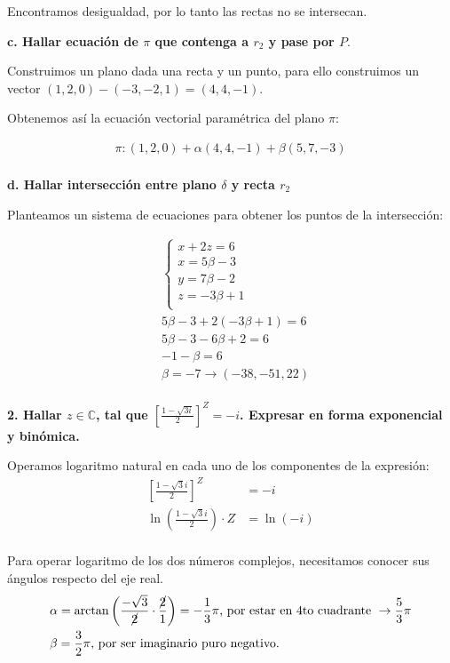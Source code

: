 \documentclass[12pt]{article}
\begin{document}
Encontramos desigualdad,
por lo tanto las rectas no se intersecan.

\textbf{c. Hallar ecuación de \(\pi\) que contenga a \(r_{2}\) y pase por \(P\)}.

Construimos un plano dada una recta y un punto, para ello construimos
un vector \((1,2,0) - (-3,-2,1) = (4,4,-1)\).

Obtenemos así la ecuación vectorial paramétrica del plano \(\pi\):

\begin{align*}
  \pi: (1,2,0) + \alpha(4,4,-1) + \beta(5,7,-3) \\
\end{align*}

\textbf{d. Hallar intersección entre plano \(\delta\) y recta \(r_{2}\)}

Planteamos un sistema de ecuaciones para obtener los puntos de la intersección:

\begin{align*}
   & \begin{cases}
       x + 2z = 6      \\
       x = 5\beta - 3  \\
       y = 7\beta - 2  \\
       z = -3\beta + 1 \\
     \end{cases}                                     \\
   & 5\beta - 3 + 2(-3\beta + 1) = 6                     \\
   & 5\beta - 3 -6\beta + 2 = 6                          \\
   & - 1 -\beta = 6                                      \\
   & \boxed{\beta = -7} \rightarrow \boxed{(-38,-51,22)} \\
\end{align*}

\textbf{2. Hallar
  \(z \in \mathbb{C}\), tal que \(\left[\frac{1-\sqrt{3i}}{2}\right]^{Z}=-i\).
  Expresar en forma exponencial y binómica.}

Operamos logaritmo natural en cada uno de los componentes de la expresión:
\begin{align*}
  \left[\frac{1-\sqrt{3}i}{2}\right]^{Z}        & =-i      \\
  \ln\left(\frac{1-\sqrt{3}i}{2}\right) \cdot Z & =\ln(-i) \\
\end{align*}

Para operar logaritmo de los dos números complejos,
necesitamos conocer sus ángulos respecto del eje real.
\begin{align*}
   & \alpha = \arctan\left(\frac{-\sqrt{3}}{\cancel{2}} \cdot \frac{\cancel{2}}{1}\right) = -\frac{1}{3}\pi\text{, por estar en 4to cuadrante }\rightarrow \frac{5}{3}\pi \\
   & \beta = \frac{3}{2}\pi\text{, por ser imaginario puro negativo.}                                                                                                     \\
\end{align*}
\end{document}
